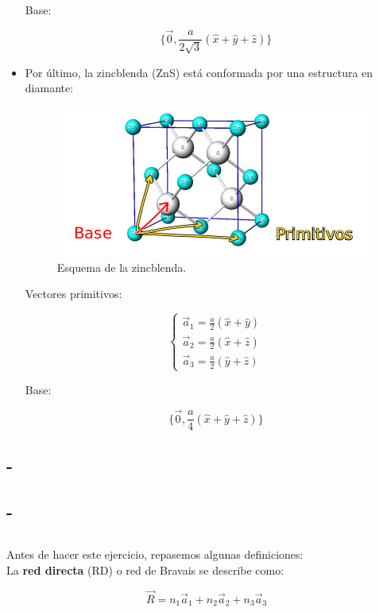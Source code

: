 \documentclass[a4paper]{article}
\begin{document}
\begin{itemize}
Base:

$$\{\vec{0}, \frac{a}{2\sqrt{3}}(\hat{x} + \hat{y} + \hat{z}) \}$$ 

\item Por \'ultimo, la zincblenda (ZnS) est\'a conformada por una estructura en diamante:

\begin{figure}[H]
  \centering
  \includegraphics[width=0.5\linewidth,height=0.3\linewidth]{zns.png}
  \caption{Esquema de la zincblenda.}
  \label{fig:zns}
\end{figure}

Vectores primitivos:

$$\begin{cases}
\vec{a}_{1} = \frac{a}{2}(\hat{x} + \hat{y}) \\
\vec{a}_{2} = \frac{a}{2}(\hat{x} + \hat{z}) \\
\vec{a}_{3} = \frac{a}{2}(\hat{y} + \hat{z})
\end{cases}$$

Base:

$$\{\vec{0}, \frac{a}{4}(\hat{x} + \hat{y} + \hat{z}) \}$$ 
\end{itemize}

\subsection{-}
\subsection{-}

\subsection{}

Antes de hacer este ejercicio, repasemos algunas definiciones: \\

La \textbf{red directa} (RD) o red de Bravais se describe como:

\begin{equation}
\label{eq:reddirecta}
\vec{R} = n_{1}\vec{a}_{1} + n_{2}\vec{a}_{2} + n_{3}\vec{a}_{3}
\end{equation}
\end{document}
